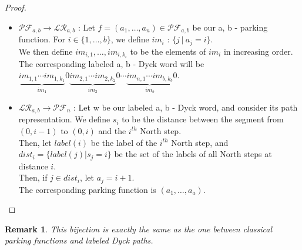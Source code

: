 \documentclass[12pt]{report}
\newtheorem*{rem}{Remark}
\begin{document}
\begin{proof}
    ~\
    \begin{itemize}
        \item $\mathcal{PF}_{a,b} \to \mathcal{LR}_{a,b}$ :
        Let $f = (a_1, \ldots, a_n) \in \mathcal{PF}_{a,b}$
        be our a, b - parking function. For $i \in \{1, \ldots,
        b\}$, we define $im_i$ : $\{j\ |\ a_j = i\}$. \\
        We then define $im_{i,1}, \ldots, im_{i,k_i}$ to be
        the elements of $im_i$ in increasing order.\\
        The corresponding labeled a, b - Dyck word will be \\
        $\underbrace{im_{1,1} \cdots im_{1,k_1}}_{im_1}0
         \underbrace{im_{2,1} \cdots im_{2,k_2}}_{im_2}0
         \cdots
         \underbrace{im_{n,1} \cdots im_{b,k_b}}_{im_b}0$.

        \item $\mathcal{LR}_{a,b} \to \mathcal{PF}_n$ :
        Let w be our labeled a, b - Dyck word, and consider its
        path representation. We define $s_i$ to be the
        distance between the segment from $(0, i-1)$ to
        $(0,i)$ and the $i^{th}$ North step.\\
        Then, let $label(i)$ be the label of the $i^{th}$
        North step, and $dist_i = \{label(j) | s_j = i\}$
        be the set of the labels of all North steps at
        distance $i$.\\
        Then, if $j \in dist_i$, let $a_j = i + 1$.\\
        The corresponding parking function is
        $(a_1, \ldots, a_a)$.
    \end{itemize}
\end{proof}

\begin{rem}
    This bijection is exactly the same as the one between
    classical parking functions and labeled Dyck paths.
\end{rem}
\end{document}

